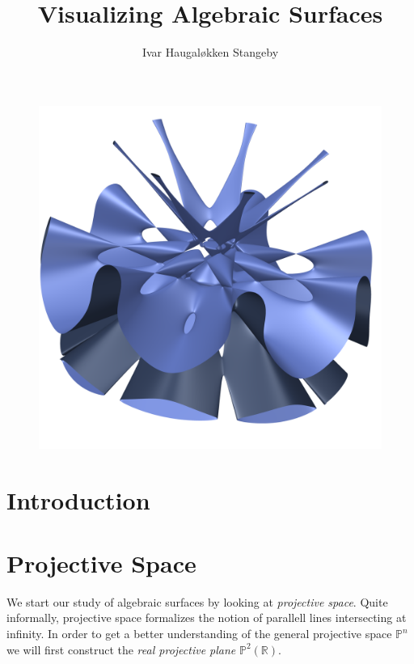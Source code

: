 \documentclass{article}
\title{Visualizing Algebraic Surfaces}
\author{Ivar Haugal{\o}kken Stangeby}
\theoremstyle{definition}
\theoremstyle{plain}
\newcommand{\proj}{\ensuremath{\mathbb{P}}} %
\newcommand{\R}{\ensuremath{\mathbb{R}}}    %
\begin{document}
\begin{titlepage}

\maketitle

\begin{figure}[h!]
    \centering
    \includegraphics[width=0.8\linewidth]{../pictures/labs_septic.png}
\end{figure}

\end{titlepage}

\begin{abstract}
    
\end{abstract}

\tableofcontents

\section{Introduction}
\label{sec:introduction}

\section{Projective Space}
\label{sec:projective_space}

We start our study of algebraic surfaces by looking at \emph{projective space}.
Quite informally, projective space formalizes the notion of parallell lines
intersecting at infinity. In order to get a better understanding of the general
projective space $\proj^n$ we will first construct the \emph{real projective
plane} $\proj^2(\R)$. 
\end{document}
